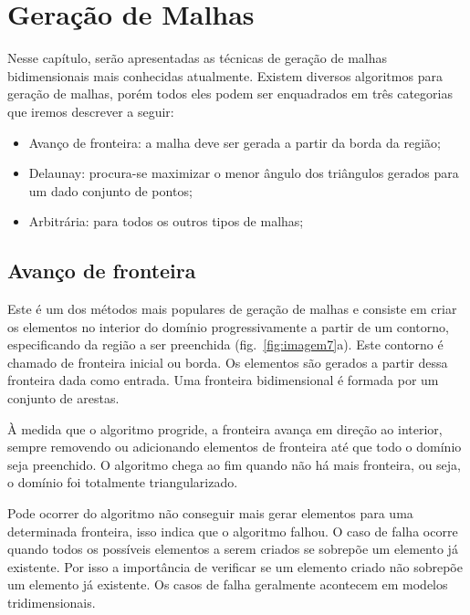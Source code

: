 \pagestyle{empty}
\cleardoublepage
\pagestyle{fancy}

\chapter{Geração de Malhas}\label{cap3}

Nesse capítulo, serão apresentadas as técnicas de geração de malhas bidimensionais mais conhecidas atualmente. Existem diversos algoritmos para geração de malhas, porém todos eles podem ser enquadrados em três categorias que iremos descrever a seguir:

\begin{itemize}
  \item Avanço de fronteira: a malha deve ser gerada a partir da borda da região;

  \item Delaunay: procura-se maximizar o menor ângulo dos triângulos gerados para um dado conjunto de pontos;

  \item Arbitrária: para todos os outros tipos de malhas;
\end{itemize}

\section{Avanço de fronteira}

Este é um dos métodos mais populares de geração de malhas e consiste em criar os elementos no interior do domínio progressivamente a partir de um contorno, especificando da região a ser preenchida (fig.~\ref{fig:imagem7}a). Este contorno é chamado de fronteira inicial ou borda. Os elementos são gerados a partir dessa fronteira dada como entrada. Uma fronteira bidimensional é formada por um conjunto de arestas.

À medida que o algoritmo progride, a fronteira avança em direção ao interior, sempre removendo ou adicionando elementos de fronteira até que todo o domínio seja preenchido. O algoritmo chega ao fim quando não há mais fronteira, ou seja, o domínio foi totalmente triangularizado. 

Pode ocorrer do algoritmo não conseguir mais gerar elementos para uma determinada fronteira, isso indica que o algoritmo falhou. O caso de falha ocorre quando todos os possíveis elementos a serem criados se sobrepõe um elemento já existente. Por isso a importância de verificar se um elemento criado não sobrepõe um elemento já existente. Os casos de falha geralmente acontecem em modelos tridimensionais.

